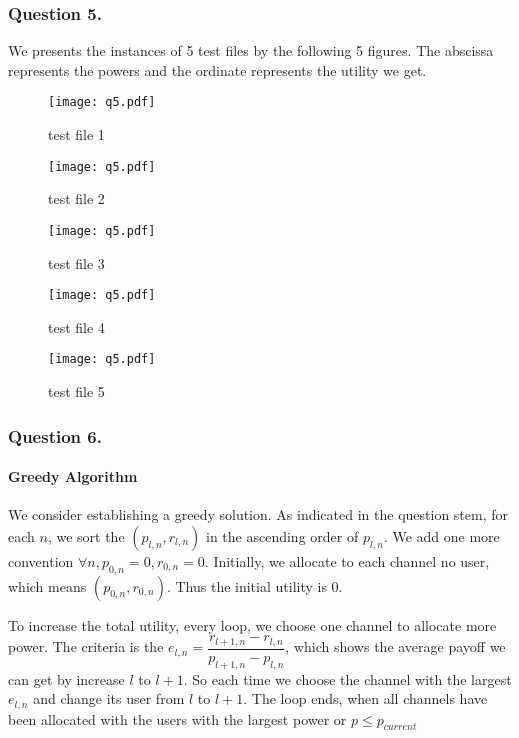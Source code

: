 \documentclass[11pt, oneside]{report}
\begin{document}
\subsubsection{Question 5.}

We presents the instances of 5 test files by the following 5 figures. The abscissa represents the powers and the ordinate represents the utility we get. 

\begin{figure}[htbp]
\centering
\begin{minipage}[t]{0.48\textwidth}
\centering
\texttt{[image: q5.pdf]}
\caption{test file 1}
\end{minipage}
\begin{minipage}[t]{0.48\textwidth}
\centering
\texttt{[image: q5.pdf]}
\caption{test file 2}
\end{minipage}
\centering
\begin{minipage}[t]{0.48\textwidth}
\centering
\texttt{[image: q5.pdf]}
\caption{test file 3}
\end{minipage}
\begin{minipage}[t]{0.48\textwidth}
\centering
\texttt{[image: q5.pdf]}
\caption{test file 4}
\end{minipage}
\centering
\begin{minipage}[t]{0.48\textwidth}
\centering
\texttt{[image: q5.pdf]}
\caption{test file 5}
\end{minipage}
\end{figure}


\subsubsection{Question 6.}
\paragraph{Greedy Algorithm} 
We consider establishing a greedy solution. As indicated in the question stem, for each $n$, we sort the $(p_{l,n}, r_{l,n})$ in the ascending order of $p_{l,n}$. We add one more convention $\forall n, p_{0,n} = 0, r_{0,n} = 0 $. Initially, we allocate to each channel no user, which means $(p_{0,n}, r_{0,n})$. Thus the initial utility is 0. 

To increase the total utility, every loop, we choose one channel to allocate more power. The criteria is the $e_{l,n} = \dfrac{r_{l+1,n} - r_{l,n}}{p_{l+1,n} - p_{l,n}}$, which shows the average payoff we can get by increase $l$ to $l+1$. So each time we choose the channel with the largest $e_{l,n}$ and change its user from $l$ to $l+1$. The loop ends, when all channels have been allocated with the users with the largest power or $p \leq p_{current}$
\end{document}
